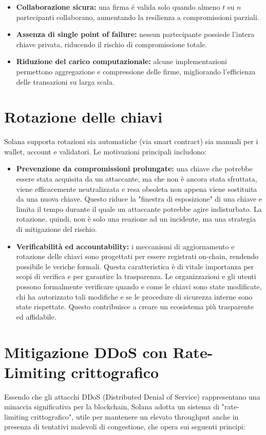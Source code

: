 \documentclass[a4paper,12pt]{report}
\begin{document}
	\begin{itemize}
		\item \textbf{Collaborazione sicura:} una firma é valida solo quando almeno \( t \) su \( n \) partecipanti collaborano, aumentando la resilienza a compromissioni parziali.
		\item \textbf{Assenza di single point of failure:} nessun partecipante possiede l’intera chiave privata, riducendo il rischio di compromissione totale.
		\item \textbf{Riduzione del carico computazionale:} alcune implementazioni permettono aggregazione e compressione delle firme, migliorando l’efficienza delle transazioni su larga scala.
	\end{itemize}
	
	\section{Rotazione delle chiavi}
	Solana supporta rotazioni sia automatiche (via smart contract) sia manuali per i wallet, account e validatori. Le motivazioni principali includono:
	\begin{itemize}
		\item \textbf{Prevenzione da compromissioni prolungate:} una chiave che potrebbe essere stata acquisita da un attaccante, ma che non è ancora stata sfruttata, viene efficacemente neutralizzata e resa obsoleta non appena viene sostituita da una nuova chiave. Questo riduce la "finestra di esposizione" di una chiave e limita il tempo durante il quale un attaccante potrebbe agire indisturbato. La rotazione, quindi, non è solo una reazione ad un incidente, ma una strategia di mitigazione del rischio.
		\item \textbf{Verificabilità ed accountability:} i meccanismi di aggiornamento e rotazione delle chiavi sono progettati per essere registrati on-chain, rendendo possibile le veriche formali. Questa caratteristica è di vitale importanza per scopi di verifica e per garantire la trasparenza. Le organizzazioni e gli utenti possono formalmente verificare quando e come le chiavi sono state modificate, chi ha autorizzato tali modifiche e se le procedure di sicurezza interne sono state rispettate. Questo contribuisce a creare un ecosistema più trasparente ed affidabile.
	\end{itemize}
	
	\section{Mitigazione DDoS con Rate-Limiting crittografico}
	Essendo che gli attacchi DDoS (Distributed Denial of Service) rappresentano una minaccia significativa per la blockchain, Solana adotta un sistema di "rate-limiting crittografico", utile per mantenere un elevato throughput anche in presenza di tentativi malevoli di congestione, che opera sui seguenti principi:
	
\end{document}
